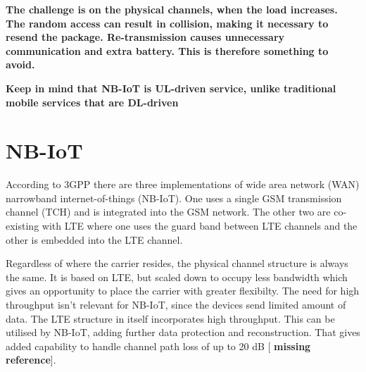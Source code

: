 \documentclass[10pt,a4paper,titlepage,twoside]{article}
\newcommand{\hghlght}[1]{\textbf{\color{ymaorng} #1}}
\newcommand{\point}[1]{\textbf{\color{ymared} #1}}
\begin{document}


\vspace{2cm}

\point{The challenge is on the physical channels, when the load increases. The random access can result in collision, making it necessary to resend the package. Re-transmission causes unnecessary communication and extra battery. This is therefore something to avoid.}

\point{Keep in mind that NB-IoT is UL-driven service, unlike traditional mobile services that are DL-driven}

\clearpage
\section{NB-IoT}

According to 3GPP there are three implementations of wide area network (WAN) narrowband internet-of-things (NB-IoT). One uses a single GSM transmission channel (TCH) and is integrated into the GSM network. The other two are co-existing with LTE where one uses the guard band between LTE channels and the other is embedded into the LTE channel.

Regardless of where the carrier resides, the physical channel structure is always the same. It is based on LTE, but scaled down to occupy less bandwidth which gives an opportunity to place the carrier with greater flexibilty. The need for high throughput isn't relevant for NB-IoT, since the devices send limited amount of data. The LTE structure in itself incorporates high throughput. This can be utilised by NB-IoT, adding further data protection and reconstruction. That gives added capability to handle channel path loss of up to 20 dB {[\hghlght{missing reference}}].
\end{document}
